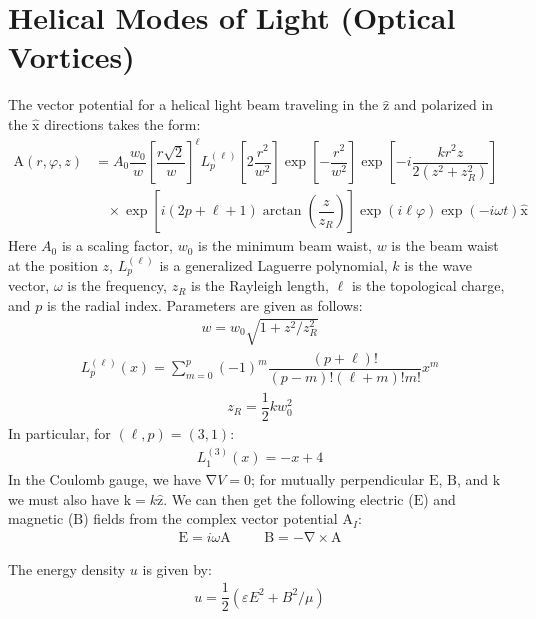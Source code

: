 \documentclass[10pt]{article}
\newcommand{\psl}{6pt} %
\newcommand{\f}[2]{\dfrac{#1}{#2}} %
\newcommand{\p}[1]{\left(#1\right)} %
\renewcommand{\sp}[1]{\left[#1\right]} %
\renewcommand{\epsilon}{\varepsilon} %
\renewcommand{\phi}{\varphi} %
\renewcommand{\v}[1]{\boldsymbol{\mathrm{#1}}} %
\newcommand{\uv}[1]{\hat{\boldsymbol{\mathrm{#1}}}} %
\newcommand{\del}{\v\nabla} %
\begin{document}
\titlespacing{\section}{0pt}{\psl}{0pt}
\section*{Helical Modes of Light (Optical Vortices)}


The vector potential for a helical light beam traveling in the $\uv z$
and polarized in the $\uv x$ directions takes the form:
\begin{align*}
  \v A\p{r,\phi,z}&=A_0\f{w_0}{w}\sp{\f{r\sqrt 2}{w}}^\ell
  L^{\p{\ell}}_p\sp{2\f{r^2}{w^2}}\exp\sp{-\f{r^2}{w^2}}
  \exp\sp{-i\f{kr^2z}{2\p{z^2+z_R^2}}} \\
  &~~~~\times\exp\sp{i\p{2p+\ell+1}\arctan\p{\f z{z_R}}}
  \exp\p{i\ell\phi}\exp\p{-i\omega t} \uv x
\end{align*}
Here $A_0$ is a scaling factor, $w_0$ is the minimum beam waist, $w$
is the beam waist at the position $z$, $L^{\p{\ell}}_p$ is a
generalized Laguerre polynomial, $k$ is the wave vector, $\omega$ is
the frequency, $z_R$ is the Rayleigh length, $\ell$ is the topological
charge, and $p$ is the radial index. Parameters are given as follows:
\begin{align*}
  w=w_0\sqrt{1+z^2/z_R^2}
\end{align*}
\begin{align*}
  L^{\p{\ell}}_p\p{x}
  =\sum_{m=0}^p\p{-1}^m\f{\p{p+\ell}!}{\p{p-m}!\p{\ell+m}!m!}x^m
\end{align*}
\begin{align*}
  z_R=\f12 kw_0^2
\end{align*}
In particular, for $\p{\ell,p}=\p{3,1}$:
\begin{align*}
  L^{\p{3}}_1\p{x}=-x+4
\end{align*}
In the Coulomb gauge, we have $\del V=0$; for mutually perpendicular
$\v E$, $\v B$, and $\v k$ we must also have $\v k=k\uv z$. We can
then get the following electric ($\v E$) and magnetic ($\v B$) fields
from the complex vector potential $\v A_I$:
\begin{align*}
  \v E=i\omega\v A &&& \v B=-\del \times\v A
\end{align*}

The energy density $u$ is given by:
\begin{align*}
  u=\f12\p{\epsilon E^2+B^2/\mu}
\end{align*}
\end{document}
